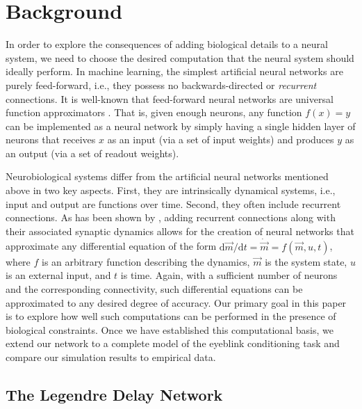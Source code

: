 \section{Background}

In order to explore the consequences of adding biological details to a neural system, we need to choose the desired computation that the neural system should ideally perform.
In machine learning, the simplest artificial neural networks are purely feed-forward, i.e., they possess no backwards-directed or \emph{recurrent} connections. It is well-known that feed-forward neural networks are universal function approximators \citep{hornik1989multilayer}.
That is, given enough neurons, any function $f(x) = y$ can be implemented as a neural network by simply having a single hidden layer of neurons that receives $x$ as an input (via a set of input weights) and produces $y$ as an output (via a set of readout weights).

Neurobiological systems differ from the artificial neural networks mentioned above in two key aspects.
First, they are intrinsically dynamical systems, i.e., input and output are functions over time.
Second, they often include recurrent connections.
As has been shown by \citet{eliasmith2003neural}, adding recurrent connections along with their associated synaptic dynamics allows for the creation of neural networks that approximate any differential equation of the form ${\mathrm{d}\vec m}/{\mathrm{d}t} = {\dot{\vec m}} = f(\vec m, u, t)$, where $f$ is an arbitrary function describing the dynamics, $\vec m$ is the system state, $u$ is an external input, and $t$ is time.
Again, with a sufficient number of neurons and the corresponding connectivity, such differential equations can be approximated to any desired degree of accuracy.
Our primary goal in this paper is to explore how well such computations can be performed in the presence of biological constraints. Once we have established this computational basis, we extend our network to a complete model of the eyeblink conditioning task and compare our simulation results to empirical data.

\subsection{The Legendre Delay Network}

